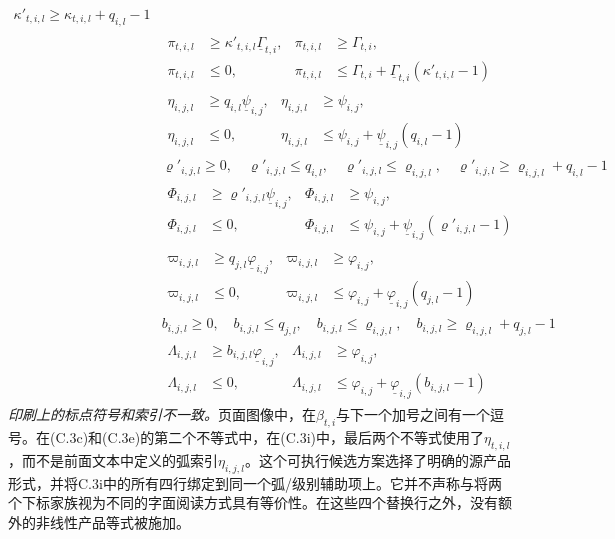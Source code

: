 \documentclass{article}
\begin{document}
\begin{align}
\kappa'_{t,i,l}\geq\kappa_{t,i,l}+q_{i,l}-1
\tag{C.3g}\\
&\begin{aligned}
\pi_{t,i,l}&\geq\kappa'_{t,i,l}\underline\Gamma_{t,i},&\pi_{t,i,l}&\geq\Gamma_{t,i},\\
\pi_{t,i,l}&\leq0,&\pi_{t,i,l}&\leq\Gamma_{t,i}+\underline\Gamma_{t,i}(\kappa'_{t,i,l}-1)
\end{aligned}\tag{C.3h}\\
&\begin{aligned}
\eta_{i,j,l}&\geq q_{i,l}\underline\psi_{i,j},&\eta_{i,j,l}&\geq\psi_{i,j},\\
\eta_{i,j,l}&\leq0,&\eta_{i,j,l}&\leq\psi_{i,j}+\underline\psi_{i,j}(q_{i,l}-1)
\end{aligned}\tag{C.3i}\\
&\varrho'_{i,j,l}\geq0,\quad\varrho'_{i,j,l}\leq q_{i,l},\quad
\varrho'_{i,j,l}\leq\varrho_{i,j,l},\quad
\varrho'_{i,j,l}\geq\varrho_{i,j,l}+q_{i,l}-1
\tag{C.3j}\\
&\begin{aligned}
\Phi_{i,j,l}&\geq\varrho'_{i,j,l}\underline\psi_{i,j},&\Phi_{i,j,l}&\geq\psi_{i,j},\\
\Phi_{i,j,l}&\leq0,&\Phi_{i,j,l}&\leq\psi_{i,j}+\underline\psi_{i,j}(\varrho'_{i,j,l}-1)
\end{aligned}\tag{C.3k}\\
&\begin{aligned}
\varpi_{i,j,l}&\geq q_{j,l}\underline\varphi_{i,j},&\varpi_{i,j,l}&\geq\varphi_{i,j},\\
\varpi_{i,j,l}&\leq0,&\varpi_{i,j,l}&\leq\varphi_{i,j}+\underline\varphi_{i,j}(q_{j,l}-1)
\end{aligned}\tag{C.3l}\\
&b_{i,j,l}\geq0,\quad b_{i,j,l}\leq q_{j,l},\quad
 b_{i,j,l}\leq\varrho_{i,j,l},\quad b_{i,j,l}\geq\varrho_{i,j,l}+q_{j,l}-1
\tag{C.3m}\\
&\begin{aligned}
\Lambda_{i,j,l}&\geq b_{i,j,l}\underline\varphi_{i,j},&\Lambda_{i,j,l}&\geq\varphi_{i,j},\\
\Lambda_{i,j,l}&\leq0,&\Lambda_{i,j,l}&\leq\varphi_{i,j}+\underline\varphi_{i,j}(b_{i,j,l}-1)
\end{aligned}\tag{C.3n}
\end{align}
\noindent\emph{印刷上的标点符号和索引不一致。}页面图像中，在$\beta_{t,i}$与下一个加号之间有一个逗号。在(C.3c)和(C.3e)的第二个不等式中，在(C.3i)中，最后两个不等式使用了$\eta_{t,i,l}$，而不是前面文本中定义的弧索引$\eta_{i,j,l}$。这个可执行候选方案选择了明确的源产品形式，并将C.3i中的所有四行绑定到同一个弧/级别辅助项上。它并不声称与将两个下标家族视为不同的字面阅读方式具有等价性。在这些四个替换行之外，没有额外的非线性产品等式被施加。
\end{document}

